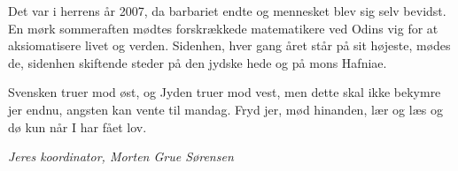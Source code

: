 \documentclass[article,10pt,a4,oneside]{memoir}
\begin{document}
\begin{minipage}[b]{0.95\textwidth}
\begin{minipage}[t]{0.47\textwidth}
Det var i herrens år 2007, da barbariet endte og mennesket blev sig selv bevidst. En mørk sommeraften mødtes forskrækkede matematikere ved Odins vig for at aksiomatisere livet og verden. Sidenhen, hver gang året står på sit højeste, mødes de, sidenhen skiftende steder på den jydske hede og på mons Hafniae.

Svensken truer mod øst, og Jyden truer mod vest, men dette skal ikke bekymre jer endnu, angsten kan vente til mandag. Fryd jer, mød hinanden, lær og læs og dø kun når I har fået lov.
 
{\flushright\emph{Jeres koordinator, Morten Grue Sørensen}}

\end{minipage}
\end{minipage}
\end{document}
